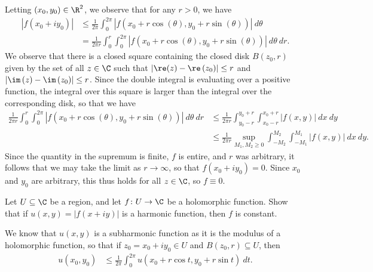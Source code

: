 \documentclass[10pt]{mypackage}
\begin{document}
\begin{solution}
  Letting $\left( x_0,y_0 \right)\in \R^{2}$, we observe that for any $r > 0$, we have
  \begin{align*}
    \left\vert f(x_0 + iy_0) \right\vert &\leq \frac{1}{2\pi} \int_{0}^{2\pi} \left\vert f\left( x_0 + r\cos\left( \theta \right),y_0 + r\sin\left( \theta \right) \right) \right\vert\:d\theta\\
                                         &= \frac{1}{2\pi r} \int_{0}^{r} \int_{0}^{2\pi} \left\vert f\left( x_0 + r\cos\left( \theta \right),y_0 + r\sin\left( \theta \right) \right) \right\vert\:d\theta\:dr.
  \end{align*}
  We observe that there is a closed square containing the closed disk $B\left( z_0,r \right)$ given by the set of all $z\in \C$ such that $ \left\vert \re(z) - \re\left( z_0 \right) \right\vert \leq r $ and $ \left\vert \im\left( z \right) - \im\left( z_0 \right) \right\vert \leq r $. Since the double integral is evaluating over a positive function, the integral over this square is larger than the integral over the corresponding disk, so that we have
  \begin{align*}
    \frac{1}{2\pi r} \int_{0}^{r} \int_{0}^{2\pi} \left\vert f\left( x_0 + r\cos\left( \theta \right),y_0 + r\sin\left( \theta \right) \right) \right\vert\:d\theta\:dr &\leq \frac{1}{2\pi r} \int_{y_0 - r}^{y_0 + r} \int_{x_0 - r}^{x_0 + r} \left\vert f\left( x,y \right) \right\vert\:dx\:dy\\
                                                                                                                                                                                   &\leq \frac{1}{2\pi r} \sup_{M_1,M_2\geq 0} \int_{-M_2}^{M_2} \int_{-M_1}^{M_1} \left\vert f\left( x,y \right) \right\vert\:dx\:dy.
  \end{align*}
  Since the quantity in the supremum is finite, $f$ is entire, and $r$ was arbitrary, it follows that we may take the limit as $r\rightarrow \infty$, so that $f\left( x_0 + iy_0 \right) = 0$. Since $x_0$ and $y_0$ are arbitrary, this thus holds for all $z\in \C$, so $f \equiv 0$.
\end{solution}
\begin{problem}[Problem 4]
  Let $U\subseteq \C$ be a region, and let $f\colon U\rightarrow \C$ be a holomorphic function. Show that if $ u\left( x,y \right) = \left\vert f\left( x + iy \right) \right\vert $ is a harmonic function, then $f$ is constant.
\end{problem}
\begin{solution}
  We know that $u\left( x,y \right)$ is a subharmonic function as it is the modulus of a holomorphic function, so that if $z_0 = x_0 + iy_0\in U$ and $B\left( z_0,r \right)\subseteq U$, then
  \begin{align*}
    u\left( x_0,y_0 \right) &\leq \frac{1}{2\pi}\int_{0}^{2\pi} u\left( x_0 + r\cos t, y_0 + r\sin t \right)\:dt.
  \end{align*}
\end{solution}
\end{document}
